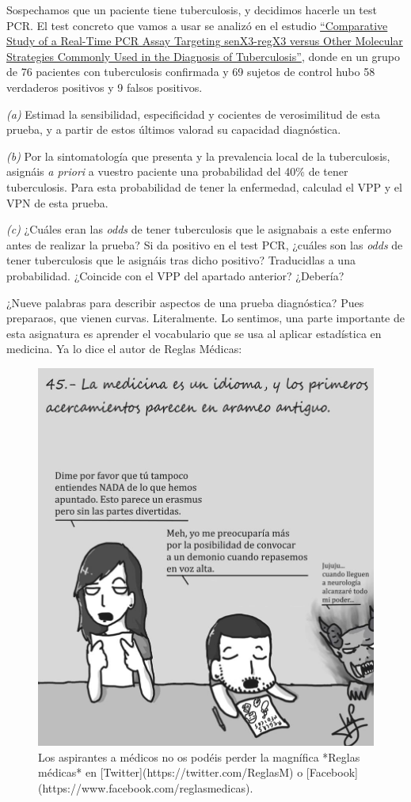\documentclass[
]{book}
\theoremstyle{definition}
\theoremstyle{definition}
\theoremstyle{definition}
\theoremstyle{definition}
\theoremstyle{remark}
\begin{document}
\begin{rmdexercici}
Sospechamos que un paciente tiene tuberculosis, y decidimos hacerle un test PCR. El test concreto que vamos a usar se analizó en el estudio \href{https://journals.plos.org/plosone/article?id=10.1371/journal.pone.0143025}{``Comparative Study of a Real-Time PCR Assay Targeting senX3-regX3 versus Other Molecular Strategies Commonly Used in the Diagnosis of Tuberculosis''}, donde en un grupo de 76 pacientes con tuberculosis confirmada y 69 sujetos de control hubo 58 verdaderos positivos y 9 falsos positivos.

\emph{(a)} Estimad la sensibilidad, especificidad y cocientes de verosimilitud de esta prueba, y a partir de estos últimos valorad su capacidad diagnóstica.

\emph{(b)} Por la sintomatología que presenta y la prevalencia local de la tuberculosis, asignáis \emph{a priori} a vuestro paciente una probabilidad del 40\% de tener tuberculosis. Para esta probabilidad de tener la enfermedad, calculad el VPP y el VPN de esta prueba.

\emph{(c)} ¿Cuáles eran las \emph{odds} de tener tuberculosis que le asignabais a este enfermo antes de realizar la prueba? Si da positivo en el test PCR, ¿cuáles son las \emph{odds} de tener tuberculosis que le asignáis tras dicho positivo? Traducidlas a una probabilidad. ¿Coincide con el VPP del apartado anterior? ¿Debería?
\end{rmdexercici}

\begin{rmdromans}
¿Nueve palabras para describir aspectos de una prueba diagnóstica? Pues preparaos, que vienen curvas. Literalmente. Lo sentimos, una parte importante de esta asignatura es aprender el vocabulario que se usa al aplicar estadística en medicina. Ya lo dice el autor de Reglas Médicas:
\end{rmdromans}

\begin{figure}

{\centering \includegraphics[width=0.5\linewidth]{INREMDN_files/figure-html/idioma} 

}

\caption{Los aspirantes a médicos no os podéis perder la magnífica *Reglas médicas* en [Twitter](https://twitter.com/ReglasM) o [Facebook](https://www.facebook.com/reglasmedicas).}\label{fig:idioma}
\end{figure}
\end{document}
